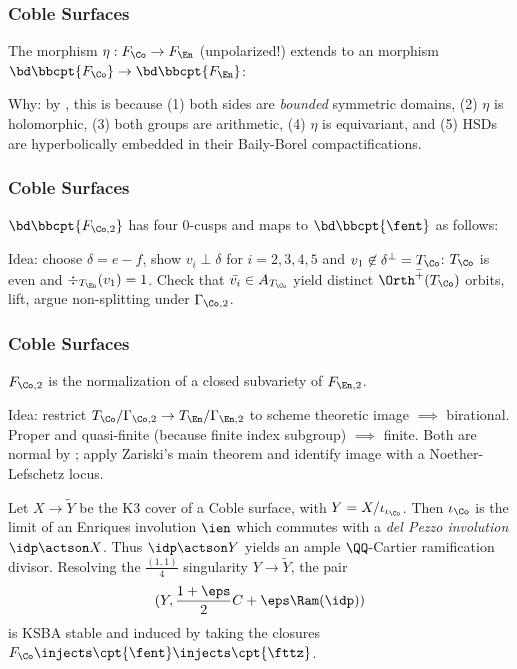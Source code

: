 \documentclass{beamer}
\begin{document}
{\begin{frame}
\end{frame}
\begin{frame}\frametitle{Coble Surfaces}
\begin{theorem}\label{thm:cusp_correspondence}
The morphism $\eta: F_\Co\to F_\En$ (unpolarized!) extends to an morphism $\bd \bbcpt{F_{\Co}} \to \bd \bbcpt{F_{\En}}$:


\end{theorem}
{\tiny
Why: by \cite{KK72}, this is because (1) both sides are \textit{bounded} symmetric domains, (2) $\eta$ is holomorphic, (3) both groups are arithmetic, (4) $\eta$ is equivariant, and (5) HSDs are hyperbolically embedded in their Baily-Borel compactifications.
}
\end{frame}
\begin{frame}\frametitle{Coble Surfaces}
{\small
\begin{conjecture}
$\bd\bbcpt{F_{\Co, 2}}$ has four 0-cusps and maps to $\bd\bbcpt{\fent}$ as follows:
\end{conjecture}
\tiny
Idea: choose $\delta = e-f$, show $v_i \perp \delta$ for $i=2,3,4,5$ \cite{Ste91} and $v_1\not\in\delta^{\perp} = T_{\Co}$: $T_{\Co}$ is even and $\div_{T_\En}(v_1) = 1$.
Check that $\bar{v_i} \in A_{T_{\Co}}$ yield distinct $\bar{\Orth^+(T_\Co)}$ orbits, lift, argue non-splitting under $\Gamma_{\Co, 2}$.
}
\end{frame}
\begin{frame}\frametitle{Coble Surfaces}
\begin{theorem}
$F_{\Co, 2}$ is the normalization of a closed subvariety of $F_{\En, 2}$.
\end{theorem}
{\small
Idea: restrict $T_{\Co}/\Gamma_{\Co, 2} \to T_{\En}/\Gamma_{\En, 2}$ to scheme theoretic image $\implies$ birational. Proper and quasi-finite (because finite index subgroup) $\implies$ finite. Both are normal by \cite{BB66}; apply Zariski's main theorem and identify image with a Noether-Lefschetz locus.
}
\begin{conjecture}
{\small
Let $X\to \tilde Y$ be the K3 cover of a Coble surface, with $Y = X/\iota_{\iota_{\Co}}$. Then $\iota_{\Co}$ is the limit of an Enriques involution $\ien$ which commutes with a \textit{del Pezzo involution} $\idp\actson X$. Thus $\idp\actson Y$ yields an ample $\QQ$-Cartier ramification divisor. Resolving the $\frac{ (1,1)}{ 4}$ singularity $Y\to \tilde Y$, the pair \[ (Y, \frac{1 + \eps}{2} C + \eps \Ram(\idp)) \] 
is KSBA stable and induced by taking the closures $F_{\Co} \injects \cpt{\fent} \injects \cpt{\fttz}$.
}
\end{conjecture}
\end{frame}

}
\end{document}
